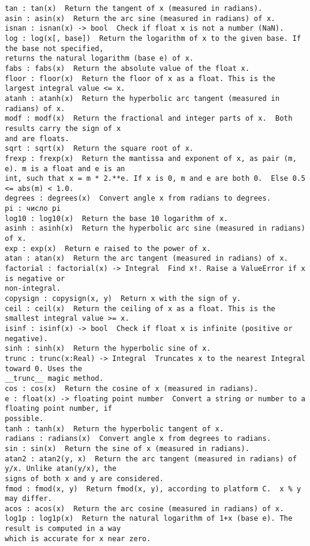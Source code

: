 \begin{verbatim}
tan : tan(x)  Return the tangent of x (measured in radians).
asin : asin(x)  Return the arc sine (measured in radians) of x.
isnan : isnan(x) -> bool  Check if float x is not a number (NaN).
log : log(x[, base])  Return the logarithm of x to the given base. If the base not specified, 
returns the natural logarithm (base e) of x.
fabs : fabs(x)  Return the absolute value of the float x.
floor : floor(x)  Return the floor of x as a float. This is the largest integral value <= x.
atanh : atanh(x)  Return the hyperbolic arc tangent (measured in radians) of x.
modf : modf(x)  Return the fractional and integer parts of x.  Both results carry the sign of x 
and are floats.
sqrt : sqrt(x)  Return the square root of x.
frexp : frexp(x)  Return the mantissa and exponent of x, as pair (m, e). m is a float and e is an 
int, such that x = m * 2.**e. If x is 0, m and e are both 0.  Else 0.5 <= abs(m) < 1.0.
degrees : degrees(x)  Convert angle x from radians to degrees.
pi : число pi
log10 : log10(x)  Return the base 10 logarithm of x.
asinh : asinh(x)  Return the hyperbolic arc sine (measured in radians) of x.
exp : exp(x)  Return e raised to the power of x.
atan : atan(x)  Return the arc tangent (measured in radians) of x.
factorial : factorial(x) -> Integral  Find x!. Raise a ValueError if x is negative or 
non-integral.
copysign : copysign(x, y)  Return x with the sign of y.
ceil : ceil(x)  Return the ceiling of x as a float. This is the smallest integral value >= x.
isinf : isinf(x) -> bool  Check if float x is infinite (positive or negative).
sinh : sinh(x)  Return the hyperbolic sine of x.
trunc : trunc(x:Real) -> Integral  Truncates x to the nearest Integral toward 0. Uses the 
__trunc__ magic method.
cos : cos(x)  Return the cosine of x (measured in radians).
e : float(x) -> floating point number  Convert a string or number to a floating point number, if 
possible.
tanh : tanh(x)  Return the hyperbolic tangent of x.
radians : radians(x)  Convert angle x from degrees to radians.
sin : sin(x)  Return the sine of x (measured in radians).
atan2 : atan2(y, x)  Return the arc tangent (measured in radians) of y/x. Unlike atan(y/x), the 
signs of both x and y are considered.
fmod : fmod(x, y)  Return fmod(x, y), according to platform C.  x % y may differ.
acos : acos(x)  Return the arc cosine (measured in radians) of x.
log1p : log1p(x)  Return the natural logarithm of 1+x (base e). The result is computed in a way 
which is accurate for x near zero.
\end{verbatim}
